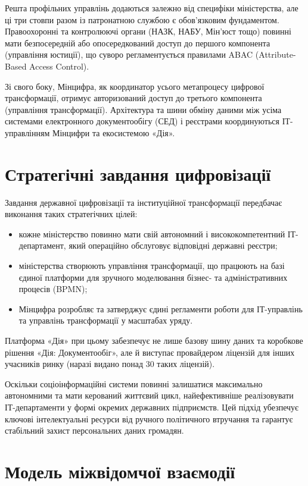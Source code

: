 Решта профільних управлінь додаються залежно від специфіки міністерства, але ці три стовпи разом із патронатною службою є обов'язковим фундаментом. Правоохоронні та контролюючі органи (НАЗК, НАБУ, Мін'юст тощо) повинні мати безпосередній або опосередкований доступ до першого компонента (управління юстиції), що суворо регламентується правилами ABAC (Attribute-Based Access Control).

Зі свого боку, Мінцифра, як координатор усього метапроцесу цифрової трансформації, отримує авторизований доступ до третього компонента (управління трансформації). Архітектура та шини обміну даними між усіма системами електронного документообігу (СЕД) і реєстрами координуються ІТ-управлінням Мінцифри та екосистемою «Дія».

\section{Стратегічні завдання цифровізації}

Завдання державної цифровізації та інституційної трансформації передбачає виконання таких стратегічних цілей:
\begin{itemize}
    \item кожне міністерство повинно мати свій автономний і висококомпетентний ІТ-департамент, який операційно обслуговує відповідні державні реєстри;
    \item міністерства створюють управління трансформації, що працюють на базі єдиної платформи для зручного моделювання бізнес- та адміністративних процесів (BPMN);
    \item Мінцифра розробляє та затверджує єдині регламенти роботи для ІТ-управлінь та управлінь трансформації у масштабах уряду.
\end{itemize}

Платформа «Дія» при цьому забезпечує не лише базову шину даних та коробкове рішення «Дія: Документообіг», але й виступає провайдером ліцензій для інших учасників ринку (наразі видано понад 30 таких ліцензій).

Оскільки соціоінформаційні системи повинні залишатися максимально автономними та мати керований життєвий цикл, найефективніше реалізовувати ІТ-департаменти у формі окремих державних підприємств. Цей підхід убезпечує ключові інтелектуальні ресурси від ручного політичного втручання та гарантує стабільний захист персональних даних громадян.

\section{Модель міжвідомчої взаємодії}

